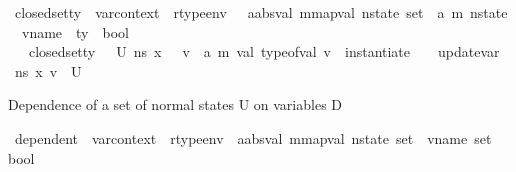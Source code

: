 \begin{isabellebody}
\isanewline
{}\isamarkupfalse%
\ closed{\isacharunderscore}{\kern0pt}set{\isacharunderscore}{\kern0pt}ty\ {\isacharcolon}{\kern0pt}{\isacharcolon}{\kern0pt}\ {\isachardoublequoteopen}var{\isacharunderscore}{\kern0pt}context\ {\isasymRightarrow}\ rtype{\isacharunderscore}{\kern0pt}env\ {\isasymRightarrow}\ \ {\isacharparenleft}{\kern0pt}{\isacharparenleft}{\kern0pt}{\isacharprime}{\kern0pt}a{\isacharcolon}{\kern0pt}{\isacharcolon}{\kern0pt}absval{\isacharcomma}{\kern0pt}\ {\isacharprime}{\kern0pt}m{\isacharcolon}{\kern0pt}{\isacharcolon}{\kern0pt}mapval{\isacharparenright}{\kern0pt}\ nstate{\isacharparenright}{\kern0pt}\ set\ {\isasymRightarrow}\ {\isacharparenleft}{\kern0pt}{\isacharprime}{\kern0pt}a{\isacharcomma}{\kern0pt}\ {\isacharprime}{\kern0pt}m{\isacharparenright}{\kern0pt}\ nstate\ {\isasymRightarrow}\ vname\ {\isasymRightarrow}\ ty\ {\isasymRightarrow}\ bool{\isachardoublequoteclose}\isanewline
\ \ \ {\isachardoublequoteopen}closed{\isacharunderscore}{\kern0pt}set{\isacharunderscore}{\kern0pt}ty\ {\isasymLambda}\ {\isasymOmega}\ U\ ns\ x\ {\isasymtau}\ {\isacharequal}{\kern0pt}\ {\isacharparenleft}{\kern0pt}{\isasymforall}v\ {\isacharcolon}{\kern0pt}{\isacharcolon}{\kern0pt}\ {\isacharparenleft}{\kern0pt}{\isacharprime}{\kern0pt}a{\isacharcomma}{\kern0pt}\ {\isacharprime}{\kern0pt}m{\isacharparenright}{\kern0pt}\ val{\isachardot}{\kern0pt}\ type{\isacharunderscore}{\kern0pt}of{\isacharunderscore}{\kern0pt}val\ v\ {\isacharequal}{\kern0pt}\ instantiate\ {\isasymOmega}\ {\isasymtau}\ {\isasymlongrightarrow}\ update{\isacharunderscore}{\kern0pt}var\ {\isasymLambda}\ ns\ x\ v\ {\isasymin}\ U{\isacharparenright}{\kern0pt}{\isachardoublequoteclose}%
\begin{isamarkuptext}%
Dependence of a set of normal states U on variables D%
\end{isamarkuptext}\isamarkuptrue%
\isamarkupfalse%
\ dependent\ {\isacharcolon}{\kern0pt}{\isacharcolon}{\kern0pt}\ {\isachardoublequoteopen}var{\isacharunderscore}{\kern0pt}context\ {\isasymRightarrow}\ rtype{\isacharunderscore}{\kern0pt}env\ {\isasymRightarrow}\ {\isacharparenleft}{\kern0pt}{\isacharparenleft}{\kern0pt}{\isacharprime}{\kern0pt}a{\isacharcolon}{\kern0pt}{\isacharcolon}{\kern0pt}absval{\isacharcomma}{\kern0pt}\ {\isacharprime}{\kern0pt}m{\isacharcolon}{\kern0pt}{\isacharcolon}{\kern0pt}mapval{\isacharparenright}{\kern0pt}\ nstate{\isacharparenright}{\kern0pt}\ set\ {\isasymRightarrow}\ vname\ set\ {\isasymRightarrow}\ bool{\isachardoublequoteclose}\ \isanewline

\end{isabellebody}
